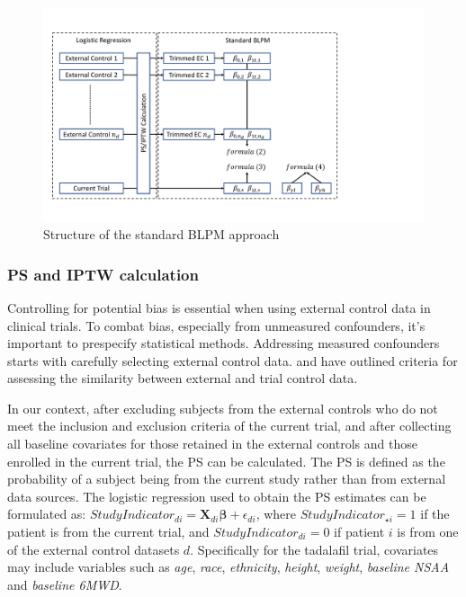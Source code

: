\begin{figure}
\centering
\includegraphics[width=\textwidth]{chapters/figures/flow.pdf}
\caption{Structure of the standard BLPM approach}
\label{fig:BLPM_diagram}
\end{figure}

\subsubsection{PS and IPTW calculation} \label{sec:ps}

Controlling for potential bias is essential when using external control data in clinical trials. To combat bias, especially from unmeasured confounders, it's important to prespecify statistical methods. Addressing measured confounders starts with carefully selecting external control data. \cite{pocock1976combination} and \cite{lim2018minimizing} have outlined criteria for assessing the similarity between external and trial control data. 

In our context, after excluding subjects from the external controls who do not meet the inclusion and exclusion criteria of the current trial, and after collecting all baseline covariates for those retained in the external controls and those enrolled in the current trial, the \ac{PS} can be calculated. The \ac{PS} is defined as the probability of a subject being from the current study rather than from external data sources. The logistic regression used to obtain the \ac{PS} estimates can be formulated as: $StudyIndicator_{di} = \boldsymbol{X}_{di}\boldsymbol{\beta} + \epsilon_{di}$, where $StudyIndicator_{\star i} = 1$ if the patient is from the current trial, and $StudyIndicator_{di} = 0$ if patient $i$ is from one of the external control datasets $d$. Specifically for the tadalafil trial, covariates may include variables such as \textit{age}, \textit{race}, \textit{ethnicity}, \textit{height}, \textit{weight}, \textit{baseline NSAA} and \textit{baseline 6MWD}.

